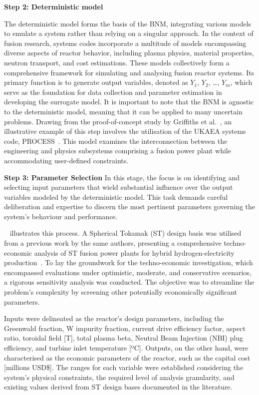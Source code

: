 \documentclass[journal]{IEEEtran}
\begin{document}
\textbf{Step 2: Deterministic model}

The deterministic model forms the basis of the BNM, integrating various models to emulate a system rather than relying on a singular approach. In the context of fusion research, systems codes incorporate a multitude of models encompassing diverse aspects of reactor behavior, including plasma physics, material properties, neutron transport, and cost estimations. These models collectively form a comprehensive framework for simulating and analysing fusion reactor systems. Its primary function is to generate output variables, denoted as $Y_1$, $Y_2$, \ldots, $Y_m$, which serve as the foundation for data collection and parameter estimation in developing the surrogate model. It is important to note that the BNM is agnostic to the deterministic model, meaning that it can be applied to many uncertain problems. Drawing from the proof-of-concept study by Griffiths et al.~\cite{Griffiths2024}, an illustrative example of this step involves the utilisation of the UKAEA systems code, PROCESS~\cite{Kovari2014, Kovari2016}. This model examines the interconnection between the engineering and physics subsystems comprising a fusion power plant while accommodating user-defined constraints.

\textbf{Step 3: Parameter Selection} 
In this stage, the focus is on identifying and selecting input parameters that wield substantial influence over the output variables modeled by the deterministic model. This task demands careful deliberation and expertise to discern the most pertinent parameters governing the system's behaviour and performance.

~\cite{Griffiths2024} illustrates this process. A Spherical Tokamak (ST) design basis was utilised from a previous work by the same authors, presenting a comprehensive techno-economic analysis of ST fusion power plants for hybrid hydrogen-electricity production~\cite{Hidalgo-Salaverri2023}. To lay the groundwork for the techno-economic investigation, which encompassed evaluations under optimistic, moderate, and conservative scenarios, a rigorous sensitivity analysis was conducted. The objective was to streamline the problem's complexity by screening other potentially economically significant parameters.

Inputs were delineated as the reactor's design parameters, including the Greenwald fraction, W impurity fraction, current drive efficiency factor, aspect ratio, toroidal field [T], total plasma beta, Neutral Beam Injection (NBI) plug efficiency, and turbine inlet temperature [ºC]. Outputs, on the other hand, were characterised as the economic parameters of the reactor, such as the capital cost [millions USD\$]. The ranges for each variable were established considering the system's physical constraints, the required level of analysis granularity, and existing values derived from ST design bases documented in the literature.
\end{document}
